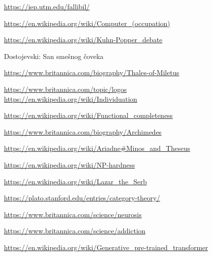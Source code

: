 \documentclass[fontsize=11bp, paper=a4]{scrartcl}
\begin{document}
\begin{thebibliography}{9}
    
    \url{https://iep.utm.edu/fallibil/}

    \url{https://en.wikipedia.org/wiki/Computer_(occupation)}

    \url{https://en.wikipedia.org/wiki/Kuhn-Popper_debate}

    Dostojevski: San smešnog čoveka

    \url{https://www.britannica.com/biography/Thales-of-Miletus}

    \url{https://www.britannica.com/topic/logos}
    \url{https://en.wikipedia.org/wiki/Individuation}
    
    \url{https://en.wikipedia.org/wiki/Functional_completeness}

    \url{https://www.britannica.com/biography/Archimedes}
    
    \url{https://en.wikipedia.org/wiki/Ariadne#Minos_and_Theseus}

    \url{https://en.wikipedia.org/wiki/NP-hardness}
    
    \url{https://en.wikipedia.org/wiki/Lazar_the_Serb}
    
    \url{https://plato.stanford.edu/entries/category-theory/}

    \url{https://www.britannica.com/science/neurosis}

    \url{https://www.britannica.com/science/addiction}

    \url{https://en.wikipedia.org/wiki/Generative_pre-trained_transformer}
\end{thebibliography}






\end{document}

